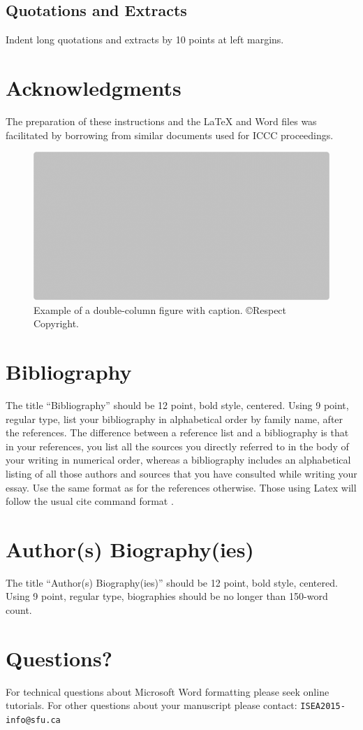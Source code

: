 \documentclass[letterpaper]{article}
\begin{document}
\subsection{Quotations and Extracts}
Indent long quotations and extracts by 10 points at left margins.

\section{Acknowledgments}
The preparation of these instructions and the \LaTeX{} and Word files was facilitated by borrowing from similar documents used for ICCC proceedings.

\begin{figure}
\includegraphics[width=\textwidth]{two-column-figure.png}
\caption{Example of a double-column figure with caption. \copyright Respect Copyright.}
\end{figure}

\section{Bibliography}
The title ``Bibliography'' should be 12 point, bold style, centered. Using 9 point, regular type, list your bibliography in alphabetical order by family name, after the references. The difference between a reference list and a bibliography is that in your references, you list all the sources you directly referred to in the body of your writing in numerical order, whereas a bibliography includes an alphabetical listing of all those authors and sources that you have consulted while writing your essay. Use the same format as for the references otherwise. Those using Latex will follow the usual cite command format \cite{boden92}.

\section{Author(s) Biography(ies)}
The title ``Author(s) Biography(ies)'' should be 12 point, bold style, centered. Using 9 point, regular type, biographies should be no longer than 150-word count.

\section{Questions?}

For technical questions about Microsoft Word formatting please seek online tutorials. For other questions about your manuscript please contact: {\tt ISEA2015-info@sfu.ca}




\end{document}
